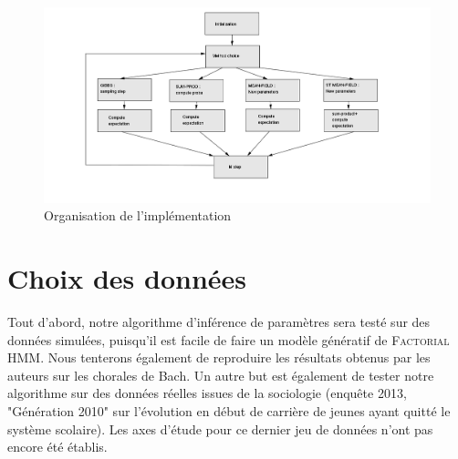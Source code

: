 \documentclass[10pt,a4paper]{article}
\newcommand{\fhmm}{\textsc{Factorial HMM}}
\begin{document}
\begin{figure}[hpbt]
  \centering
    \includegraphics[scale=1]{algograph.png}
  \caption{Organisation de l'implémentation\label{fig:implem_structure}}
\end{figure}

\section{Choix des données}

Tout d'abord, notre algorithme d'inférence de paramètres sera testé sur des
données simulées, puisqu'il est facile de faire un modèle génératif de
\fhmm.
Nous tenterons également de reproduire les résultats obtenus par les auteurs sur
les chorales de Bach.
Un autre but est également de tester notre algorithme sur des données réelles
issues de la sociologie (enquête 2013, "Génération 2010" sur l'évolution en
début de carrière de jeunes ayant quitté le système scolaire).
Les axes d'étude pour ce dernier jeu de données n'ont pas encore été établis.
\end{document}
